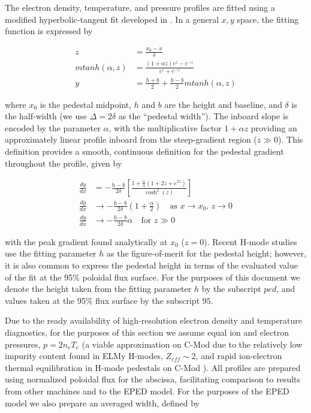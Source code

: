 The electron density, temperature, and pressure profiles are fitted using a modified hyperbolic-tangent fit developed in \cite{Groebner2001}.  In a general $x,y$ space, the fitting function is expressed by

\begin{equation}\label{eq:mtanh}
 \begin{aligned}
  z &= \frac{x_0 - x}{\delta}\\
  mtanh(\alpha,z) &= \frac{(1 + \alpha z) e^z - e^{-z}}{e^z + e^{-z}}\\
  y &= \frac{h+b}{2} + \frac{h-b}{2} mtanh(\alpha,z)
 \end{aligned}
\end{equation}

\noindent where $x_0$ is the pedestal midpoint, $h$ and $b$ are the height and baseline, and $\delta$ is the half-width (we use $\Delta = 2\delta$ as the ``pedestal width'').  The inboard slope is encoded by the parameter $\alpha$, with the multiplicative factor $1 + \alpha z$ providing an approximately linear profile inboard from the steep-gradient region ($z \gg 0$).  This definition provides a smooth, continuous definition for the pedestal gradient throughout the profile, given by

\begin{equation}\label{eq:mtanh_grad}
 \begin{aligned}
  \frac{dy}{dx} &= -\frac{h-b}{2\delta} \left[ \frac{1 + \frac{\alpha}{4}\left( 1 + 2z + e^{2z} \right)}{\cosh^2(z)}\right]\\
 \frac{dy}{dx} &\rightarrow -\frac{h-b}{2\delta}\left(1 + \frac{\alpha}{2}\right) \quad \mbox{as $x\rightarrow x_0$, $z \rightarrow 0$}\\
 \frac{dy}{dx} &\rightarrow -\frac{h-b}{2\delta}\alpha \quad \mbox{for $z \gg 0$}
 \end{aligned}
\end{equation}

\noindent with the peak gradient found analytically at $x_0$ ($z=0$).  Recent H-mode studies use the fitting parameter $h$ as the figure-of-merit for the pedestal height; however, it is also common to express the pedestal height in terms of the evaluated value of the fit at the 95\% poloidal flux surface.  For the purposes of this document we denote the height taken from the fitting parameter $h$ by the subscript $ped$, and values taken at the 95\% flux surface by the subscript $95$. 

Due to the ready availability of high-resolution electron density and temperature diagnostics, for the purposes of this section we assume equal ion and electron pressures, $p = 2n_e T_e$ (a viable approximation on C-Mod due to the relatively low impurity content found in ELMy H-modes, $Z_{eff} \sim 2$, and rapid ion-electron thermal equilibration in H-mode pedestals on C-Mod \cite{McDermott2009a}).  All profiles are prepared using normalized poloidal flux for the abscissa, facilitating comparison to results from other machines and to the EPED model.  For the purposes of the EPED model we also prepare an averaged width, defined by


